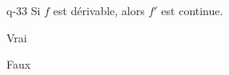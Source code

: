 \begin{truefalse}{q-33}
Si $f$ est dérivable, alors $f'$ est continue.
\item Vrai
\item* Faux
\end{truefalse}

